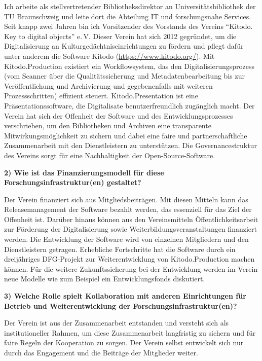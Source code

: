 \documentclass[a4paper,
fontsize=11pt,
oneside,
numbers=noperiodatend,
parskip=half-,
bibliography=totoc,
final
]{scrartcl}
\begin{document}
Ich arbeite als stellvertretender Bibliotheksdirektor an
Universitätsbibliothek der TU Braunschweig und leite dort die Abteilung
IT und forschungsnahe Services. Seit knapp zwei Jahren bin ich
Vorsitzender des Vorstands des Vereins \enquote{Kitodo. Key to digital
objects} e.\,V. Dieser Verein hat sich 2012 gegründet, um die
Digitalisierung an Kulturgedächtniseinrichtungen zu fördern und pflegt
dafür unter anderem die Software Kitodo (\url{https://www.kitodo.org/}).
Mit Kitodo.Production existiert ein Workflowsystem, das den
Digitalisierungsprozess (vom Scanner über die Qualitätssicherung und
Metadatenbearbeitung bis zur Veröffentlichung und Archivierung und
gegebenenfalls mit weiteren Prozessschritten) effizient steuert.
Kitodo.Presentation ist eine Präsentationssoftware, die Digitalisate
benutzerfreundlich zugänglich macht. Der Verein hat sich der Offenheit
der Software und des Entwicklungsprozesses verschrieben, um den
Bibliotheken und Archiven eine transparente Mitwirkungsmöglichkeit zu
sichern und dabei eine faire und partnerschaftliche Zusammenarbeit mit
den Dienstleistern zu unterstützen. Die Governancestruktur des Vereins
sorgt für eine Nachhaltigkeit der Open-Source-Software.

\textbf{2) Wie ist das Finanzierungsmodell für diese
Forschungsinfrastruktur(en) gestaltet?}

Der Verein finanziert sich aus Mitgliedsbeiträgen. Mit diesen Mitteln
kann das Releasemanagement der Software bezahlt werden, das essenziell
für das Ziel der Offenheit ist. Darüber hinaus können aus den
Vereinsmitteln Öffentlichkeitsarbeit zur Förderung der Digitalisierung
sowie Weiterbildungsveranstaltungen finanziert werden. Die Entwicklung
der Software wird von einzelnen Mitgliedern und den Dienstleistern
getragen. Erhebliche Fortschritte hat die Software durch ein
dreijähriges DFG-Projekt zur Weiterentwicklung von Kitodo.Production
machen können. Für die weitere Zukunftssicherung bei der Entwicklung
werden im Verein neue Modelle wie zum Beispiel ein Entwicklungsfonds
diskutiert.

\textbf{3) Welche Rolle spielt Kollaboration mit anderen Einrichtungen
für Betrieb und Weiterentwicklung der Forschungsinfrastruktur(en)?}

Der Verein ist aus der Zusammenarbeit entstanden und versteht sich als
institutioneller Rahmen, um diese Zusammenarbeit langfristig zu sichern
und für faire Regeln der Kooperation zu sorgen. Der Verein selbst
entwickelt sich nur durch das Engagement und die Beiträge der Mitglieder
weiter.
\end{document}
